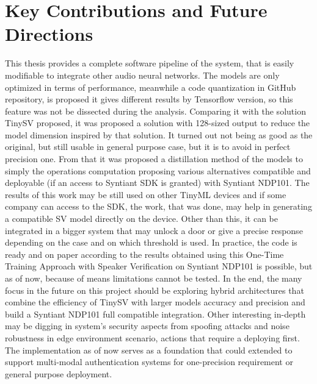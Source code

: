 \section{Key Contributions and Future Directions}
\label{sec:key contributions}
This thesis provides a complete software pipeline of the system, that is easily modifiable to integrate other audio neural networks. The models are only optimized in terms of performance, meanwhile a code quantization in GitHub repository, is proposed it gives different results by Tensorflow version, so this feature was not be dissected during the analysis. Comparing it with the solution TinySV proposed\cite{dvector_extractor_TinySV}\cite{dvector_extractor_code}, it was proposed a solution with 128-sized output to reduce the model dimension inspired by that solution. It turned out not being as good as the original, but still usable in general purpose case, but it is to avoid in perfect precision one. From that it was proposed a distillation method of the models to simply the operations computation proposing various alternatives compatible and deployable (if an access to Syntiant SDK is granted) with Syntiant NDP101.\newline
The results of this work may be still used on other TinyML devices and if some company can access to the SDK, the work, that was done, may help in generating a compatible SV model directly on the device. Other than this, it can be integrated in a bigger system that may unlock a door or give a precise response depending on the case and on which threshold is used. In practice, the code is ready and on paper according to the results obtained using this One-Time Training Approach with Speaker Verification on Syntiant NDP101 is possible, but as of now, because of means limitations cannot be tested. In the end, the many focus in the future on this project should be exploring hybrid architectures that combine the efficiency of TinySV with larger models accuracy and precision and build a Syntiant NDP101 full compatible integration. Other interesting in-depth may be digging in system's security aspects from spoofing attacks and noise robustness in edge environment scenario, actions that require a deploying first. The implementation as of now serves as a foundation that could extended to support multi-modal authentication systems for one-precision requirement or general purpose deployment.
\newpage